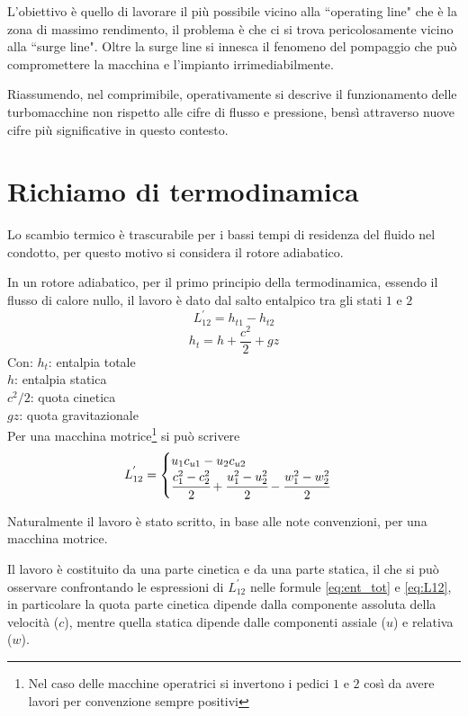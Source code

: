 L'obiettivo è quello di lavorare il più possibile vicino alla ``operating line" che è la zona di massimo rendimento, il problema è che ci si trova pericolosamente vicino alla ``surge line". Oltre la surge line si innesca il fenomeno del pompaggio che può compromettere la macchina e l'impianto irrimediabilmente.

Riassumendo, nel comprimibile, operativamente si descrive il funzionamento delle turbomacchine non rispetto alle cifre di flusso e pressione, bensì attraverso nuove cifre più significative in questo contesto.
\section{Richiamo di termodinamica}
Lo scambio termico è trascurabile per i bassi tempi di residenza del fluido nel condotto, per questo motivo si considera il rotore adiabatico.

In un rotore adiabatico, per il primo principio della termodinamica, essendo il flusso di calore nullo, il lavoro è dato dal salto entalpico tra gli stati $1$ e $2$
\begin{equation}
L_{12}^{'} = h_{t1}-h_{t2}
\end{equation}
\begin{equation}\label{eq:ent_tot}
h_t=h+\frac{c^2}{2}+gz
\end{equation}
Con: 
$h_t$: entalpia totale\\
$h$: entalpia statica\\
$c^2/2$: quota cinetica\\
$gz$: quota gravitazionale\\[2mm]
Per una macchina motrice\footnote{Nel caso delle macchine operatrici si invertono i pedici $1$ e $2$ così da avere lavori per convenzione sempre positivi} si può scrivere
\begin{equation}\label{eq:L12}
L_{12}^{'} = \begin{cases} u_1 c_{u1}-u_2 c_{u2}\\
\cfrac{c_1^2-c_2^2}{2}+\cfrac{u_1^2-u_2^2}{2}-\cfrac{w_1^2-w_2^2}{2} \end{cases}
\end{equation}

Naturalmente il lavoro è stato scritto, in base alle note convenzioni, per una macchina motrice.

Il lavoro è costituito da una parte cinetica e da una parte statica, il che si può osservare confrontando le espressioni di $L_{12}^{'}$ nelle formule \ref{eq:ent_tot} e \ref{eq:L12}, in particolare la quota parte cinetica dipende dalla componente assoluta della velocità ($c$), mentre quella statica dipende dalle componenti assiale ($u$) e relativa ($w$).

